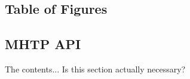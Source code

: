 \documentclass[11pt]{report}
\begin{document}
\tableofcontents
\newpage

\section{Table of Figures}
\newpage


\newpage

\newpage

\newpage

\newpage

\newpage

\newpage

\newpage

\newpage

\newpage

\newpage


\newpage



\newpage
\begin{appendices}
\chapter{MHTP API}
The contents...
Is this section actually necessary?
\end{appendices}
\end{document}
